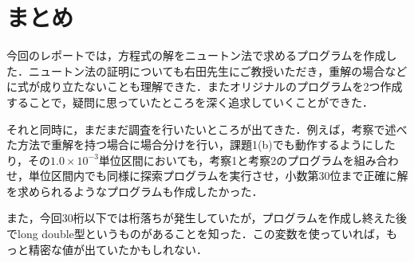\documentclass[12pt]{jarticle}
\begin{document}
\section{まとめ}

今回のレポートでは，方程式の解をニュートン法で求めるプログラムを作成した．ニュートン法の証明についても右田先生にご教授いただき，重解の場合などに式が成り立たないことも理解できた．またオリジナルのプログラムを2つ作成することで，疑問に思っていたところを深く追求していくことができた．

それと同時に，まだまだ調査を行いたいところが出てきた．例えば，考察で述べた方法で重解を持つ場合に場合分けを行い，課題1(b)でも動作するようにしたり，その$1.0 \times 10^{-3}$単位区間においても，考察1と考察2のプログラムを組み合わせ，単位区間内でも同様に探索プログラムを実行させ，小数第30位まで正確に解を求められるようなプログラムも作成したかった．

また，今回30桁以下では桁落ちが発生していたが，プログラムを作成し終えた後でlong double型というものがあることを知った．この変数を使っていれば，もっと精密な値が出ていたかもしれない．
















































\end{document}
